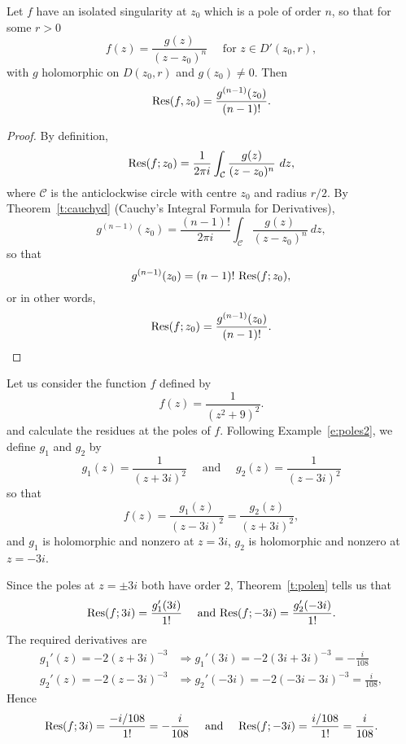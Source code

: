 \begin{theorem}
\label{t:polen}
Let $f$ have an isolated singularity at $z_0$ which is a pole of order $n$, so that for some $r>0$
\[
f(z) = \frac{g(z)}{(z-z_0)^n} \quad \text{ for } z \in D'(z_0,r),
\]
with $g$ holomorphic on $D(z_0,r)$ and $g(z_0) \neq 0$.  Then
\[
\mathrm{Res} (f,z_0) = \frac{g^{(n-1)}(z_0)}{(n-1)!}.
\]
\end{theorem}
\begin{proof}
By definition,
\[
\Res (f;z_0) = \frac{1}{2\pi i} \int_{\mathcal{C}} \frac{g(z)}{(z-z_0)^n}\ dz,
\]
where $\mathcal{C}$ is the anticlockwise circle with centre $z_0$ and radius $r/2$.  By Theorem~\ref{t:cauchyd} (Cauchy's Integral Formula for Derivatives),
\[
g^{(n-1)} (z_0) = \frac{(n-1)!}{2\pi i} \int_{\mathcal{C}} \frac{g(z)}{(z-z_0)^n}\ dz,
\]
so that
\[
g^{(n-1)} (z_0) = (n-1)!\ \mathrm{Res} (f;z_0),
\]
or in other words,
\[
\mathrm{Res} (f;z_0) = \frac{g^{(n-1)}(z_0)}{(n-1)!}.
\]
\end{proof}



\begin{example}
\label{e:res3}
Let us consider the function $f$ defined by
\[
f(z) = \frac{1}{(z^2+9)^2}.
\]
and calculate the residues at the poles of $f$.
Following Example~\ref{e:poles2}, we define $g_1$ and $g_2$ by
\[
g_1(z) = \frac{1}{(z+3i)^2} \quad\text{ and }\quad g_2(z) = \frac{1}{(z-3i)^2}
\]
so that
\[
f(z) = \frac{g_1(z)}{(z-3i)^2} = \frac{g_2(z)}{(z+3i)^2},
\]
and $g_1$ is holomorphic and nonzero at $z=3i$, $g_2$ is holomorphic and nonzero at $z=-3i$.  

Since the poles at $z=\pm 3i$ both have order $2$, Theorem~\ref{t:polen} tells us that
\[
\mathrm{Res} (f;3i) =\frac{g_1'(3i)}{1!} \quad\text{ and } \mathrm{Res} (f;-3i) = \frac{g_2'(-3i)}{1!}.
\]
The required derivatives are
\begin{align*}
g_1'(z) = -2(z+3i)^{-3} & \Rightarrow g_1'(3i) = -2(3i+3i)^{-3} = - \frac{i}{108} \\
g_2'(z) = -2(z-3i)^{-3} & \Rightarrow g_2'(-3i) = -2(-3i-3i)^{-3} = \frac{i}{108},
\end{align*}
Hence
\[
\mathrm{Res} (f;3i) = \frac{-i/108}{1!} = - \frac{i}{108} \quad\text{ and }\quad \mathrm{Res} (f;-3i) = \frac{i/108}{1!}= \frac{i}{108}.
\]

\end{example}

